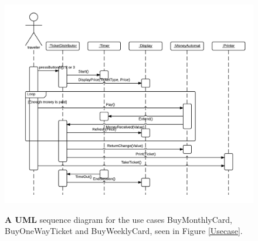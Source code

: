 \documentclass[a4paper]{article}
\begin{document}
	\begin{figure}
		\centering
		\includegraphics[width=0.95\textheight, angle = 270]{SequenceDiagram.png}\\
		\caption{\textbf{A UML} sequence diagram for the use cases BuyMonthlyCard, BuyOneWayTicket and BuyWeeklyCard, seen in Figure \ref{Usecase}.}
	\end{figure}
\end{document}
